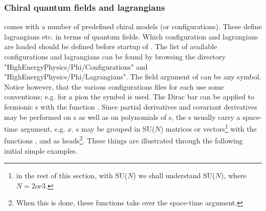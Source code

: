 \subsubsection{Chiral quantum fields and lagrangians}

\fphi comes with a number of predefined chiral models (or configurations). These define lagrangians etc. in terms of quantum fields. Which configuration and lagrangians are loaded should be defined before startup of \fc. The list of available configurations and lagrangians can be found by browsing the directory "HighEnergyPhysics/Phi/Configurations" and "HighEnergyPhysics/Phi/Lagrangians".
\beom
{}
\enom
{}
The field argument of  can be any symbol. Notice however, that the various configurations files for \fphi each use some conventions; e.g. for a pion the symbol  is used. The Dirac bar can be applied to fermionic s with the function . Since partial derivatives and covariant derivatives may be performed on s as well as on polynomials of s, the s usually carry a space-time argument, e.g. $x$. s may be grouped in SU($N$) matrices or vectors\footnote{in the rest of this section, with  SU($N$) we shall understand  SU($N$), where $N=2 or 3$.} with the functions ,  and  as heads\footnote{When this is done, these functions take over the space-time argument.}. These things are illustrated through the following initial simple examples.
